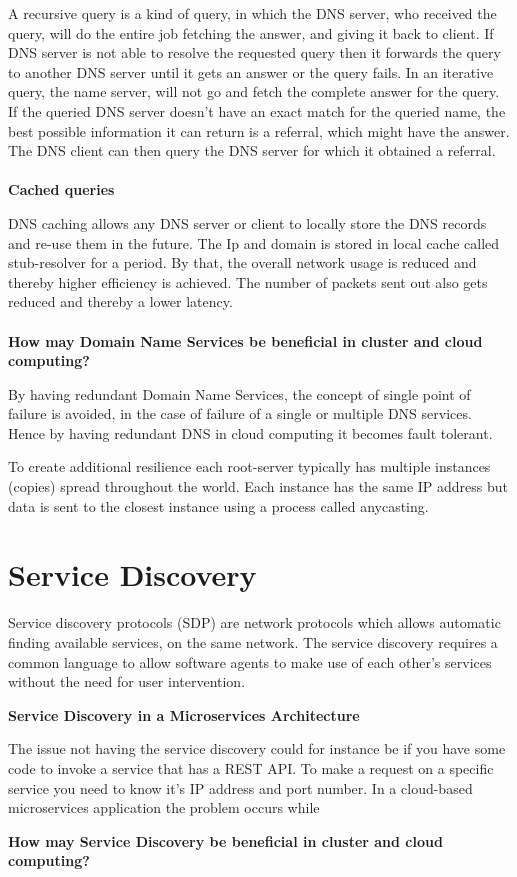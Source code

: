 A recursive query is a kind of query, in which the DNS server, who received the query, will do the entire job fetching the answer, and giving it back to client. If DNS server is not able to resolve the requested query then it forwards the query to another DNS server until it gets an answer or the query fails.
In an iterative query, the name server, will not go and fetch the complete answer for the query. If the queried DNS server doesn't have an exact match for the queried name, the best possible information it can return is a referral, which might have the answer. The DNS client can then query the DNS server for which it obtained a referral.
\\\\
\textbf{Cached queries}

DNS caching allows any DNS server or client to locally store the DNS records and re-use them in the future. The Ip and domain is stored in local cache called stub-resolver for a period. By that, the overall network usage is reduced and thereby higher efficiency is achieved. The number of packets sent out also gets reduced and thereby a lower latency. 
\\\\
\textbf{How may Domain Name Services be beneficial in cluster and cloud computing?}


By having redundant Domain Name Services, the concept of single point of failure is avoided, in the case of failure of a single or multiple DNS services. Hence by having redundant DNS in cloud computing it becomes fault tolerant.  
   

To create additional resilience each root-server typically has multiple instances (copies) spread throughout the world. Each instance has the same IP address but data is sent to the closest instance using a process called anycasting.

\section{Service Discovery}
Service discovery protocols (SDP) are network protocols which allows automatic finding available services, on the same network. The service discovery requires a common language to allow software agents to make use of each other's services without the need for user intervention.


\textbf{Service Discovery in a Microservices Architecture}

The issue not having the service discovery could for instance be if you have some code to invoke a service that has a REST API. To make a request on a specific service you need to know it's IP address and port number. In a cloud-based microservices application the problem occurs while      



\textbf{How may Service Discovery be beneficial in cluster and cloud computing?}  
